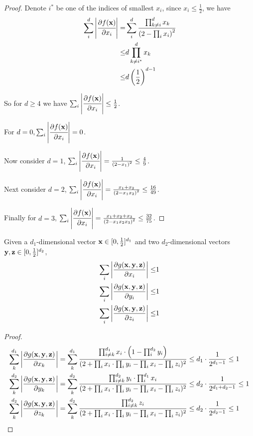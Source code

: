 	\begin{proof}
		Denote $i^*$ be one of the indices of smallest $x_i$, since $x_i \leq \frac{1}{2}$, we have
	\begin{align*}
		\sum_i^d \left\vert\cfrac{\partial f({\bf x})}{\partial x_i}\right\vert  =& \sum_i^d \cfrac{ \prod_{k \neq i}^d x_k  }{\left( 2 - \prod_i x_i \right)^2} \\
		\leq & d \prod_{k \neq i^*}^d x_k \\
		\leq & d \left( \frac{1}{2} \right)^{d-1}
	\end{align*}

	So for $d \geq 4$ we have $\sum_i \left\vert\cfrac{\partial f({\bf x})}{\partial x_i}\right\vert \leq \frac{1}{2}$.

	For $d=0, \sum_i\left\vert \cfrac{\partial f({\bf x})}{\partial x_i}\right\vert = 0$.

	Now consider $d=1$, $\sum_i\left\vert \cfrac{\partial f({\bf x})}{\partial x_i}\right\vert = \frac{1}{\left( 2 - x_1 \right)^2} \leq \frac{4}{9} $.

	Next consider $d=2$,  $\sum_i\left\vert \cfrac{\partial f({\bf x})}{\partial x_i}\right\vert = \frac{x_1 + x_2}{\left( 2 - x_1x_2 \right)^2} \leq \frac{16}{49} $.

	Finally for $d=3$,  $\sum_i\left\vert \cfrac{\partial f({\bf x})}{\partial x_i}\right\vert = \frac{x_1 + x_2 + x_3}{\left( 2 - x_1x_2x_3 \right)^2} \leq \frac{32}{75} $.
	\end{proof}


	\begin{Lem}
Given a $d_1$-dimensional vector ${\bf x} \in [0, \frac{1}{2}]^{d_1}$ and two $d_2$-dimensional vectors ${\bf y,z} \in [0, \frac{1}{2}]^{d_2}$,
\label{lemnormalpd}
		\begin{align*}
			 \sum_i\left\vert \frac{\partial g({\bf x,y,z})}{\partial x_i} \right\vert \leq & 1 \\
			\sum_i \left\vert \frac{\partial g({\bf x,y,z})}{\partial y_i} \right\vert \leq & 1 \\
			\sum_i \left\vert \frac{\partial g({\bf x,y,z})}{\partial z_i} \right\vert \leq & 1
		\end{align*}
	\end{Lem}

	\begin{proof}
		\begin{align*}
			\sum_k^{d_1} \left\vert \frac{\partial g({\bf x,y,z})}{\partial x_k} \right\vert &= \sum_k^{d_1} \frac{\prod_{i\neq k}^{d_1} x_i \cdot \left( 1 - \prod_i^{d_2} y_i \right)}{(2+\prod_i x_i \cdot \prod_i y_i - \prod_i x_i - \prod_i z_i)^2} 
		\leq d_1\cdot  \frac{1}{2^{d_1 - 1}}  \leq 1 \\
		\sum_k^{d_2} \left\vert \frac{\partial g({\bf x,y,z})}{\partial y_k} \right\vert &= \sum_k^{d_2} \frac{\prod_{i\neq k}^{d_2} y_i \cdot \prod_{i}^{d_1} x_i}{(2+\prod_i x_i \cdot \prod_i y_i - \prod_i x_i - \prod_i z_i)^2} 
		\leq d_2 \cdot \frac{1}{2^{d_1 + d_2 - 1}} \leq 1 \\
		\sum_k^{d_2} \left\vert \frac{\partial g({\bf x,y,z})}{\partial z_k} \right\vert &= \sum_k^{d_2} \frac{\prod_{i\neq k}^{d_2} z_i }{(2+\prod_i x_i \cdot \prod_i y_i - \prod_i x_i - \prod_i z_i)^2} 
		\leq d_2 \cdot \frac{1}{2^{d_2 - 1}} \leq 1 \\
		\end{align*}
	\end{proof}

